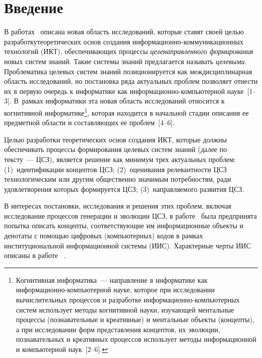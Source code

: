       \begin{multicols}{2}

      \label{st\stat}
      
\section{Введение}

   В работах~\cite{1zat, 2zat} описана новая область ис\-следо\-ва\-ний, которые ставят 
своей целью разработку\linebreak теоре\-ти\-че\-ских основ создания ин\-фор\-ма\-ци\-он\-но-ком\-му\-ни\-ка\-ци\-он\-ных 
технологий (ИКТ), обеспечивающих процессы \textit{целенаправленного формирования} 
новых систем знаний. Такие системы знаний предлагается называть \textit{целевыми}. 
Проблематика целевых систем знаний позиционируется как междисциплинарная область 
исследований, но постановка ряда актуальных проблем позволяет отнести их в первую 
очередь к информатике как ин\-фор\-ма\-ци\-он\-но-компью\-тер\-ной науке~[1--3]. В~рамках 
информатики эта новая область исследований относится к когнитивной 
информатике\footnote[2]{Когнитивная информатика~--- направление в информатике как 
   ин\-фор\-ма\-ци\-он\-но-компью\-тер\-ной науке, которое при исследовании вычислительных процессов и разработке 
ин\-фор\-ма\-ци\-он\-но-компью\-тер\-ных систем использует методы когнитивной науки, изучающей ментальные 
процессы (познавательные и креативные) и ментальные объекты (концепты), а при исследовании форм 
представления концептов, их эволюции, познавательных и креативных процессов использует методы 
информационной и компьютерной наук~[2--6].}, которая находится в начальной стадии описания 
ее предметной области и составляющих ее проблем~[4--6].
   
   
   Целью разработки теоретических основ создания ИКТ, которые должны обеспечивать 
процессы формирования целевых систем знаний (далее по тексту~--- ЦСЗ), является решение 
как минимум трех актуальных проблем: (1)~идентификации концептов ЦСЗ; (2)~оценивания 
релевантности ЦСЗ технологическим или другим общественно значимым потребностям, 
ради удовлетворения которых формируется ЦСЗ; (3)~направляемого развития ЦСЗ.
   
   В интересах постановки, исследования и решения этих проблем, включая исследование 
процессов генерации и эволюции ЦСЗ, в работе~\cite{2zat} была предпринята попытка 
описать концепты, соответствующие им информационные объекты и денотаты с помощью 
цифровых (компьютерных) кодов в рамках институциональной информационной сис\-те\-мы 
(ИИС). Характерные черты ИИС описаны в работе ~\cite{7zat}.


\end{multicols}
